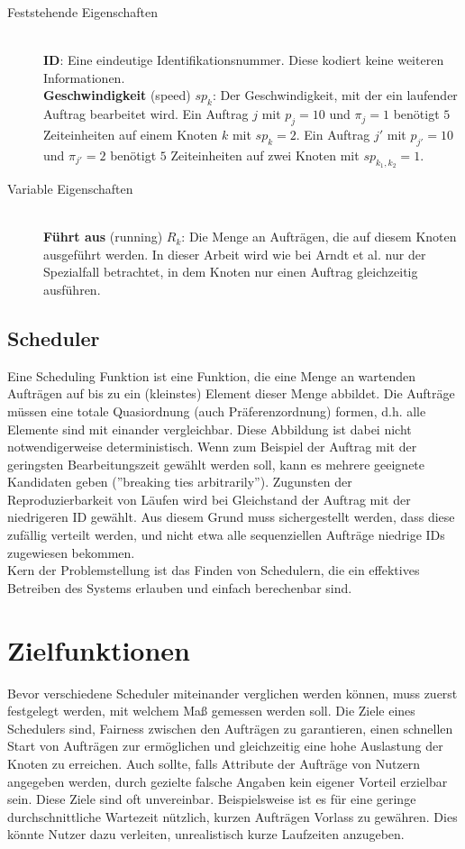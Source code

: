 \begin{description}
	\item[Feststehende Eigenschaften] \hfil \\
	\textbf{ID}: Eine eindeutige Identifikationsnummer. Diese kodiert keine weiteren Informationen.\\
	\textbf{Geschwindigkeit} (speed) $sp_k$: Der Geschwindigkeit, mit der ein laufender Auftrag bearbeitet wird. Ein Auftrag $j$ mit $p_j = 10$ und $\pi_j = 1$ benötigt $5$ Zeiteinheiten auf einem Knoten $k$ mit $sp_k = 2$. Ein Auftrag $j'$ mit $p_{j'} = 10$ und $\pi_{j'} = 2$ benötigt $5$ Zeiteinheiten auf zwei Knoten mit $sp_{k_1, k_2} = 1$.\\
	\item[Variable Eigenschaften] \hfil \\
	\textbf{Führt aus} (running) $R_k$: Die Menge an Aufträgen, die auf diesem Knoten ausgeführt werden. In dieser Arbeit wird wie bei Arndt et al. \cite{Arn99} nur der Spezialfall betrachtet, in dem Knoten nur einen Auftrag gleichzeitig ausführen.\\
\end{description}


\subsection{Scheduler}
Eine Scheduling Funktion ist eine Funktion, die eine Menge an wartenden Aufträgen auf bis zu ein (kleinstes) Element dieser Menge abbildet. Die Aufträge müssen eine totale Quasiordnung (auch  Präferenzordnung) formen, d.h. alle Elemente sind mit einander vergleichbar.
Diese Abbildung ist dabei nicht notwendigerweise deterministisch. Wenn zum Beispiel der Auftrag mit der geringsten Bearbeitungszeit gewählt werden soll, kann es mehrere geeignete Kandidaten geben (''breaking ties arbitrarily'')\cite{Kar97}. Zugunsten der Reproduzierbarkeit von Läufen wird bei Gleichstand der Auftrag mit der niedrigeren ID gewählt. Aus diesem Grund muss sichergestellt werden, dass diese zufällig verteilt werden, und nicht etwa alle sequenziellen Aufträge niedrige IDs zugewiesen bekommen.\\
Kern der Problemstellung ist das Finden von Schedulern, die ein effektives Betreiben des Systems erlauben und einfach berechenbar sind.

\section{Zielfunktionen}
Bevor verschiedene Scheduler miteinander verglichen werden können, muss zuerst festgelegt werden, mit welchem Maß gemessen werden soll. Die Ziele eines Schedulers sind, Fairness zwischen den Aufträgen zu garantieren, einen schnellen Start von Aufträgen zur ermöglichen und gleichzeitig eine hohe Auslastung der Knoten zu erreichen. Auch sollte, falls Attribute der Aufträge von Nutzern angegeben werden, durch gezielte falsche Angaben kein eigener Vorteil erzielbar sein. Diese Ziele sind oft unvereinbar. Beispielsweise ist es für eine geringe durchschnittliche Wartezeit nützlich, kurzen Aufträgen Vorlass zu gewähren. Dies könnte Nutzer dazu verleiten, unrealistisch kurze Laufzeiten anzugeben.

